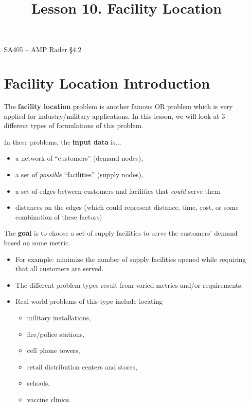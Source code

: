 \documentclass[11pt]{article}
\makeatletter
\theoremstyle{definition}
\renewcommand{\maketitle}{
  \noindent SA405 -- AMP \hfill Rader \S 4.2 \\

  \begin{center}\Large{\textbf{\@title}}\end{center}
}
\makeatother
\begin{document}
  
\title{Lesson 10.  Facility Location}

\maketitle

\section{Facility Location Introduction}

The \textbf{facility location} problem is another famous OR problem which is very applied for industry/military applications. In this lesson, we will look at 3 different types of formulations of this problem.


In these problems, the \textbf{input data} is...
\begin{itemize}
\item  a network of ``customers'' (demand nodes),
\item  a set of \emph{possible} ``facilities'' (supply nodes),
\item  a set of edges between customers and facilities that \emph{could} serve them
\item  distances on the edges (which could represent distance, time, cost, or some combination of these factors)
\end{itemize} 


The \textbf{goal} is to choose a set of supply facilities to serve the customers' demand based on some metric.
\begin{itemize}
\item For example: minimize the number of supply facilities opened while requiring that all customers are served.  
\item The different problem types result from varied metrics and/or requirements.
\item  Real world problems of this type include locating 
\begin{itemize}
\item military installations, 
\item fire/police stations, 
\item cell phone towers, 
\item retail distribution centers and stores, 
\item schools,
\item vaccine clinics.
\end{itemize}
\end{itemize}
\end{document}

